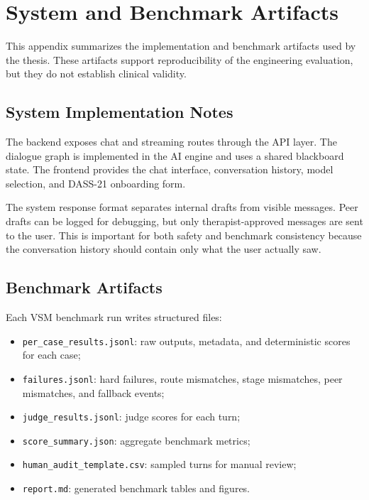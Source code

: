 \chapter{System and Benchmark Artifacts}

This appendix summarizes the implementation and benchmark artifacts used by the thesis. These artifacts support reproducibility of the engineering evaluation, but they do not establish clinical validity.

\section{System Implementation Notes}

The backend exposes chat and streaming routes through the API layer. The dialogue graph is implemented in the AI engine and uses a shared blackboard state. The frontend provides the chat interface, conversation history, model selection, and DASS-21 onboarding form.

The system response format separates internal drafts from visible messages. Peer drafts can be logged for debugging, but only therapist-approved messages are sent to the user. This is important for both safety and benchmark consistency because the conversation history should contain only what the user actually saw.

\section{Benchmark Artifacts}

Each VSM benchmark run writes structured files:

\begin{itemize}
    \item \texttt{per\_case\_results.jsonl}: raw outputs, metadata, and deterministic scores for each case;
    \item \texttt{failures.jsonl}: hard failures, route mismatches, stage mismatches, peer mismatches, and fallback events;
    \item \texttt{judge\_results.jsonl}: judge scores for each turn;
    \item \texttt{score\_summary.json}: aggregate benchmark metrics;
    \item \texttt{human\_audit\_template.csv}: sampled turns for manual review;
    \item \texttt{report.md}: generated benchmark tables and figures.
\end{itemize}

